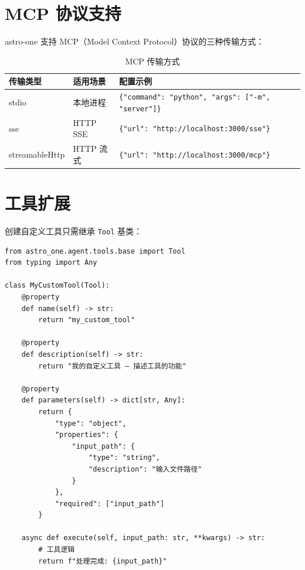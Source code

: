 \documentclass[12pt,a4paper,UTF8]{ctexart}
\begin{document}
\section{MCP 协议支持}

astro-one 支持 MCP（Model Context Protocol）协议的三种传输方式：

\begin{table}[H]
\centering
\begin{tabular}{L{2.5cm} L{5cm} L{7.5cm}}
\toprule
\textbf{传输类型} & \textbf{适用场景} & \textbf{配置示例} \\
\midrule
stdio & 本地进程 & \texttt{\{"command": "python", "args": ["-m", "server"]\}} \\
sse & HTTP SSE & \texttt{\{"url": "http://localhost:3000/sse"\}} \\
streamableHttp & HTTP 流式 & \texttt{\{"url": "http://localhost:3000/mcp"\}} \\
\bottomrule
\end{tabular}
\caption{MCP 传输方式}
\end{table}

\section{工具扩展}

创建自定义工具只需继承 \texttt{Tool} 基类：

\begin{verbatim}
from astro_one.agent.tools.base import Tool
from typing import Any

class MyCustomTool(Tool):
    @property
    def name(self) -> str:
        return "my_custom_tool"

    @property
    def description(self) -> str:
        return "我的自定义工具 — 描述工具的功能"

    @property
    def parameters(self) -> dict[str, Any]:
        return {
            "type": "object",
            "properties": {
                "input_path": {
                    "type": "string",
                    "description": "输入文件路径"
                }
            },
            "required": ["input_path"]
        }

    async def execute(self, input_path: str, **kwargs) -> str:
        # 工具逻辑
        return f"处理完成: {input_path}"
\end{verbatim}

\end{document}
